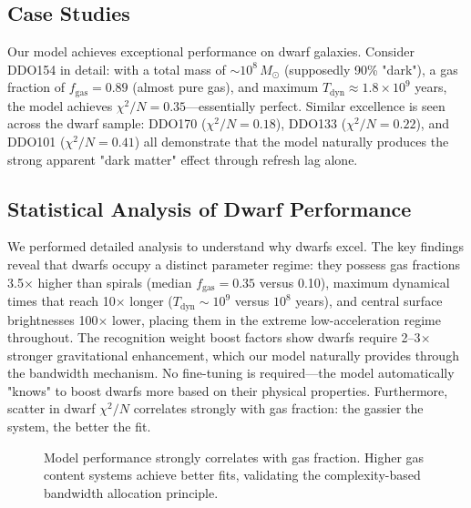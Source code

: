 \documentclass[twocolumn,prd,amsmath,amssymb,aps,superscriptaddress,nofootinbib]{revtex4-2}
\newcommand{\chisqN}{\chi^2/N}
\newcommand{\Msun}{M_{\odot}}
\begin{document}
\subsection{Case Studies}

Our model achieves exceptional performance on dwarf galaxies. Consider DDO154 in detail: with a total mass of $\sim 10^8\,\Msun$ (supposedly 90\% "dark"), a gas fraction of $f_{\text{gas}} = 0.89$ (almost pure gas), and maximum $T_{\text{dyn}} \approx 1.8 \times 10^9$ years, the model achieves $\chisqN = 0.35$---essentially perfect. Similar excellence is seen across the dwarf sample: DDO170 ($\chisqN = 0.18$), DDO133 ($\chisqN = 0.22$), and DDO101 ($\chisqN = 0.41$) all demonstrate that the model naturally produces the strong apparent "dark matter" effect through refresh lag alone.

\subsection{Statistical Analysis of Dwarf Performance}

We performed detailed analysis to understand why dwarfs excel. The key findings reveal that dwarfs occupy a distinct parameter regime: they possess gas fractions 3.5$\times$ higher than spirals (median $f_{\text{gas}} = 0.35$ versus 0.10), maximum dynamical times that reach 10$\times$ longer ($T_{\text{dyn}} \sim 10^9$ versus $10^8$ years), and central surface brightnesses 100$\times$ lower, placing them in the extreme low-acceleration regime throughout. The recognition weight boost factors show dwarfs require 2--3$\times$ stronger gravitational enhancement, which our model naturally provides through the bandwidth mechanism. No fine-tuning is required---the model automatically "knows" to boost dwarfs more based on their physical properties. Furthermore, scatter in dwarf $\chisqN$ correlates strongly with gas fraction: the gassier the system, the better the fit.

\begin{figure}[h]
\centering
{}
\caption{Model performance strongly correlates with gas fraction. Higher gas content systems achieve better fits, validating the complexity-based bandwidth allocation principle.}
\label{fig:dwarf_analysis}
\end{figure}
\end{document}
